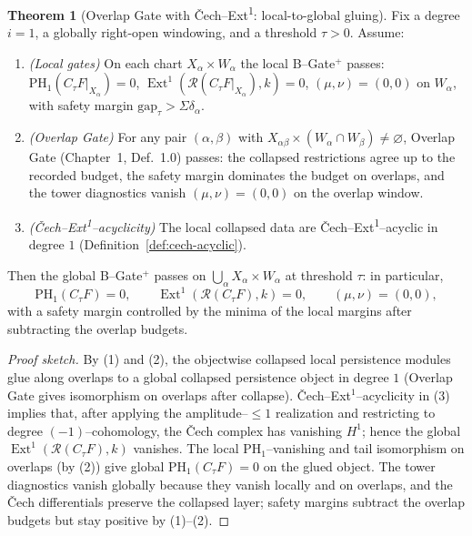\documentclass[11pt]{article}
\numberwithin{equation}{section}
\theoremstyle{plain}
\theoremstyle{definition}
\theoremstyle{remark}
\DeclareMathOperator{\Ext}{Ext}
\theoremstyle{plain}
\theoremstyle{definition}
\numberwithin{equation}{section}
\newtheorem{theorem}{Theorem}[section]
\theoremstyle{definition}
\numberwithin{equation}{section}
\theoremstyle{plain}
\theoremstyle{definition}
\theoremstyle{remark}
\begin{document}
\begin{theorem}[Overlap Gate with Čech–Ext\textsuperscript{1}: local-to-global gluing]\label{thm:cech-glue}
Fix a degree $i=1$, a globally right-open windowing, and a threshold $\tau>0$. Assume:
\begin{enumerate}
  \item \emph{(Local gates)} On each chart $X_\alpha\times W_\alpha$ the local B–Gate$^{+}$ passes: $\mathrm{PH}_1(C_\tau F|_{X_\alpha})=0$, $\Ext^1(\mathcal{R}(C_\tau F|_{X_\alpha}),k)=0$, $(\mu,\nu)=(0,0)$ on $W_\alpha$, with safety margin $\mathrm{gap}_\tau>\Sigma\delta_\alpha$.
  \item \emph{(Overlap Gate)} For any pair $(\alpha,\beta)$ with $X_{\alpha\beta}\times(W_\alpha\cap W_\beta)\neq\varnothing$, Overlap Gate (Chapter~1, Def.~1.0) passes: the collapsed restrictions agree up to the recorded budget, the safety margin dominates the budget on overlaps, and the tower diagnostics vanish $(\mu,\nu)=(0,0)$ on the overlap window.
  \item \emph{(Čech–Ext\textsuperscript{1}–acyclicity)} The local collapsed data are Čech–Ext\textsuperscript{1}–acyclic in degree $1$ (Definition~\ref{def:cech-acyclic}).
\end{enumerate}
Then the global B–Gate$^{+}$ passes on $\bigcup_\alpha X_\alpha\times W_\alpha$ at threshold $\tau$: in particular,
\[
\mathrm{PH}_1(C_\tau F)=0,\qquad \Ext^1(\mathcal{R}(C_\tau F),k)=0,\qquad (\mu,\nu)=(0,0),
\]
with a safety margin controlled by the minima of the local margins after subtracting the overlap budgets.
\end{theorem}

\begin{proof}[Proof sketch]
By (1) and (2), the objectwise collapsed local persistence modules glue along overlaps to a global collapsed persistence object in degree $1$ (Over\-lap Gate gives isomorphism on overlaps after collapse). Čech–Ext$^1$–acyclicity in (3) implies that, after applying the amplitude–$\le 1$ realization and restricting to degree $(-1)$–cohomology, the Čech complex has vanishing $H^1$; hence the global $\Ext^1(\mathcal{R}(C_\tau F),k)$ vanishes. The local $\mathrm{PH}_1$–vanishing and tail isomorphism on overlaps (by (2)) give global $\mathrm{PH}_1(C_\tau F)=0$ on the glued object. The tower diagnostics vanish globally because they vanish locally and on overlaps, and the Čech differentials preserve the collapsed layer; safety margins subtract the overlap budgets but stay positive by (1)–(2).
\end{proof}
\end{document}
